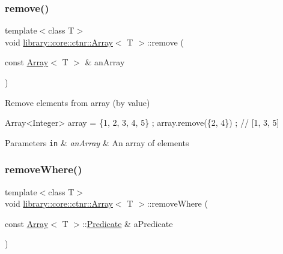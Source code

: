 \subsubsection{\texorpdfstring{remove()}{remove()}\hspace{0.1cm}{\footnotesize\ttfamily [2/2]}}
{\footnotesize\ttfamily template$<$class T$>$ \\
void \hyperlink{classlibrary_1_1core_1_1ctnr_1_1_array}{library\+::core\+::ctnr\+::\+Array}$<$ T $>$\+::remove (\begin{DoxyParamCaption}\item[{const \hyperlink{classlibrary_1_1core_1_1ctnr_1_1_array}{Array}$<$ T $>$ \&}]{an\+Array }\end{DoxyParamCaption})}



Remove elements from array (by value) 


\begin{DoxyCode}
Array<Integer> array = \{1, 2, 3, 4, 5\} ;
array.remove(\{2, 4\}) ; \textcolor{comment}{// [1, 3, 5]}
\end{DoxyCode}



\begin{DoxyParams}[1]{Parameters}
\mbox{\tt in}  & {\em an\+Array} & An array of elements \\
\hline
\end{DoxyParams}
\mbox{\label{classlibrary_1_1core_1_1ctnr_1_1_array_a322b1bfc3a93ea18bf68eb0cff69e6d3}} 
\subsubsection{\texorpdfstring{remove\+Where()}{removeWhere()}}
{\footnotesize\ttfamily template$<$class T$>$ \\
void \hyperlink{classlibrary_1_1core_1_1ctnr_1_1_array}{library\+::core\+::ctnr\+::\+Array}$<$ T $>$\+::remove\+Where (\begin{DoxyParamCaption}\item[{const \hyperlink{classlibrary_1_1core_1_1ctnr_1_1_array}{Array}$<$ T $>$\+::\hyperlink{classlibrary_1_1core_1_1ctnr_1_1_array_a74cd325a740870aea490b6b739aa06ae}{Predicate} \&}]{a\+Predicate }\end{DoxyParamCaption})}



